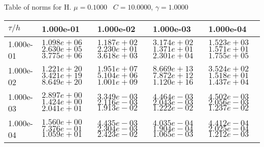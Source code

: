 \begin{center}
Table of norms for H. $\mu = 0.1000$ \, $C = 10.0000$, $\gamma = 1.0000$
  
\begin{tabular}{|p{1in}|p{1in}|p{1in}|p{1in}|p{1in}|} \hline
$\tau / h$ &1.000e-01 &1.000e-02 &1.000e-03 &1.000e-04 \\ \hline 
1.000e-01 & $1.098e+06$  $2.630e+05$  $3.775e+06$  & $1.187e+02$  $2.230e+01$  $3.618e+03$  & $3.174e+02$  $1.371e+01$  $2.301e+04$  & $1.523e+03$  $1.571e+01$  $1.755e+05$  \\ \hline 
1.000e-02 & $1.221e+20$  $3.421e+19$  $8.649e+20$  & $1.951e+07$  $5.104e+06$  $1.001e+09$  & $8.669e+13$  $7.872e+12$  $1.120e+16$  & $3.524e+02$  $1.518e+01$  $1.437e+04$  \\ \hline 
1.000e-03 & $2.897e+00$  $1.424e+00$  $2.041e+01$  & $3.349e-03$  $2.116e-03$  $1.913e-02$  & $4.464e-03$  $2.043e-03$  $1.222e-02$  & $4.502e-03$  $2.056e-03$  $1.237e-02$  \\ \hline 
1.000e-04 & $1.560e+00$  $7.376e-01$  $1.059e+01$  & $4.435e-03$  $2.304e-03$  $2.423e-02$  & $4.035e-04$  $1.904e-04$  $1.065e-03$  & $4.412e-04$  $2.025e-04$  $1.212e-03$  \\ \hline 

\end{tabular}\\[20pt]
\end{center}
